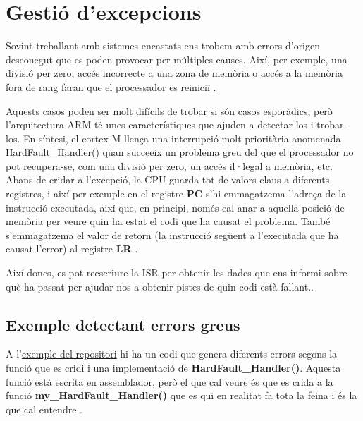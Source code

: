 
\chapter{Gestió d'excepcions}
\label{ch:exceptions}
Sovint treballant amb sistemes encastats ens trobem amb errors d'origen desconegut que es poden provocar per múltiples causes. Així, per exemple, una divisió per zero, accés incorrecte a una zona de memòria o accés a la memòria fora de rang faran que el processador es reiniciï \cite[102]{DesignersGuide}\cite[318]{ARMsdg}\cite{KielHardFault}.

Aquests casos poden ser molt difícils de trobar si són casos esporàdics, però l'arquitectura ARM té unes característiques que ajuden a detectar-los i trobar-los. En síntesi, el cortex-M llença una interrupció molt prioritària anomenada HardFault\_Handler() quan succeeix un problema greu del que el processador no pot recupera-se, com una divisió per zero, un accés il·legal a memòria, etc. Abans de cridar a l'excepció, la CPU guarda tot de valors claus a diferents registres, i així per exemple en el registre {\bf PC} s'hi emmagatzema l'adreça de la instrucció executada, així que, en principi, només cal anar a aquella posició de memòria per veure quin ha estat el codi que ha causat el problema. També s'emmagatzema el valor de retorn (la  instrucció següent a l'executada que ha causat l'error) al registre {\bf LR} \cite{BlogHardFalut}.

Així doncs, es pot reescriure la ISR per obtenir les dades que ens informi sobre què ha passat per ajudar-nos a obtenir pistes de quin codi està fallant.\cite{ARMHandler}.

\section{Exemple detectant errors greus}
A l'\href{https://github.com/mariusmm/cursembedded/tree/master/Simplicity/ErrorHandling}{exemple del repositori} hi ha un codi que genera diferents errors segons la funció que es cridi i una implementació de {\bf HardFault\_Handler()}. Aquesta funció està escrita en assemblador, però el que cal veure és que es crida a la funció {\bf my\_HardFault\_Handler()} que es qui en realitat fa tota la feina i és la que cal entendre \cite{EFM32HardFault}.

